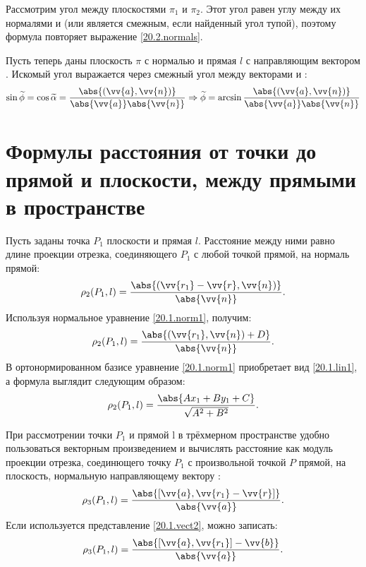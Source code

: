   Рассмотрим угол между плоскостями $\pi_1$ и $\pi_2$. Этот угол равен углу между их нормалями  и  (или является смежным, если найденный угол тупой), поэтому формула повторяет выражение \ref{20.2.normals}.
  
  Пусть теперь даны плоскость $\pi$ с нормалью  и прямая $l$ с направляющим вектором . Искомый угол выражается через смежный угол между векторами  и :
  \begin{equation}
  \sin  \widetilde \phi = \cos  \widetilde \alpha = \dfrac{\abs{(\vv{a},\vv{n})}}{\abs{\vv{a}} \abs{\vv{n}}} \Rightarrow
  \widetilde \phi = \arcsin \dfrac{\abs{(\vv{a},\vv{n})}}{\abs{\vv{a}} \abs{\vv{n}}}
  \end{equation}



\section{Формулы расстояния от точки до прямой и плоскости, между прямыми в пространстве}
  Пусть заданы точка $P_1$ плоскости и прямая $l$. Расстояние между ними равно длине проекции отрезка, соединяющего $P_1$ с любой точкой прямой, на нормаль прямой:
  \begin{equation}\label{20.3.normals1}
  \rho_2 (P_1,l) = \dfrac{ \abs{(\vv{r_1}-\vv{r},\vv{n})} }{ \abs{\vv{n}} }.
  \end{equation}   
  Используя нормальное уравнение \ref{20.1.norm1}, получим:
  \begin{equation}\label{20.3.normals2}
  \rho_2 (P_1,l) = \dfrac{\abs{(\vv{r_1},\vv{n})+D}}{\abs{\vv{n}}}.
  \end{equation}
  В ортонормированном базисе уравнение \ref{20.1.norm1} приобретает вид \ref{20.1.lin1}, а формула выглядит следующим образом:
  \begin{equation}
  \rho_2 (P_1,l) = \dfrac{\abs{Ax_1+By_1+C}}{\sqrt{A^2+B^2}}.
  \end{equation}
  
  При рассмотрении точки $P_1$ и прямой l в трёхмерном пространстве удобно пользоваться векторным произведением и вычислять расстояние как модуль проекции отрезка, соединющего точку $P_1$ с произвольной точкой $P$ прямой, на плоскость, нормальную направляющему вектору :
  \begin{equation}
  \rho_3 (P_1,l) = \dfrac{\abs{[\vv{a},\vv{r_1}-\vv{r}]}}{\abs{\vv{a}}}.
  \end{equation}
  Если используется представление \ref{20.1.vect2}, можно записать:
  \begin{equation}
  \rho_3 (P_1,l) = \dfrac{\abs{[\vv{a},\vv{r_1}]-\vv{b}}}{\abs{\vv{a}}}.
  \end{equation}

